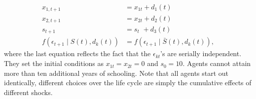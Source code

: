 \begin{align*}
x_{1,t+1}  &= x_{1t} + d_1(t) \\
x_{2,t+1} &= x_{2t} + d_2(t) \\
s_{t+1}   &= s_{t\phantom{2}}    + d_3(t) \\
f(\epsilon_{t+1}\mid S(t), d_k(t)) &= f(\epsilon_{t+1}\mid \bar{S}(t), d_k(t)),
\end{align*}
%
where the last equation reflects the fact that the $\epsilon_{kt}$'s are serially independent. They set the initial conditions as $x_{1t} = x_{2t} = 0$ and $s_0 = 10$. Agents cannot attain more than ten additional years of schooling. Note that all agents start out identically, different choices over the life cycle are simply the cumulative effects of different shocks.
